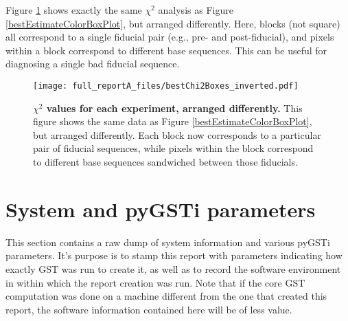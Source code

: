 \documentclass{article}[11pt]
\begin{document}
{Figure \ref{invertedBestEstimateColorBoxPlot} shows exactly the same $\chi^2$ analysis as Figure \ref{bestEstimateColorBoxPlot}, but arranged differently.  Here, blocks (not square) all correspond to a single fiducial pair (e.g., pre- and post-fiducial), and pixels within a block correspond to different base sequences.  This can be useful for diagnosing a single bad fiducial sequence.

\begin{figure}
\begin{center}
\texttt{[image: full\_reportA\_files/bestChi2Boxes\_inverted.pdf]}
\caption{\textbf{$\chi^2$ values for each experiment, arranged differently.}  This figure shows the same data as Figure \ref{bestEstimateColorBoxPlot}, but arranged differently.  Each block now corresponds to a particular pair of fiducial sequences, while pixels within the block correspond to different base sequences sandwiched between those fiducials.\label{invertedBestEstimateColorBoxPlot}}
\end{center}
\end{figure}

}{}

\section{System and pyGSTi parameters\label{metadata}}
This section contains a raw dump of system information and various pyGSTi parameters.  It's purpose is to stamp this report with parameters indicating how exactly GST was run to create it, as well as to record the software environment in within which the report creation was run.  Note that if the core GST computation was done on a machine different from the one that created this report, the software information contained here will be of less value.
\end{document}
